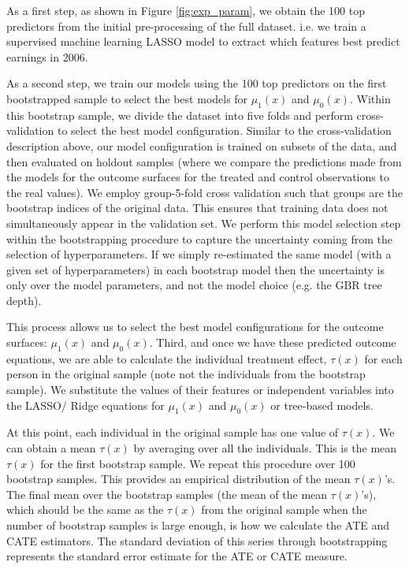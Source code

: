 \documentclass[12pt, a4paper]{article}
\begin{document}
As a first step, as shown in Figure \ref{fig:exp_param}, we obtain the 100 top predictors from the initial pre-processing of the full dataset. i.e. we train a supervised machine learning LASSO model to extract which features best predict earnings in 2006.

As a second step, we train our models using the 100 top predictors on the first bootstrapped sample to select the best models for $\mu _1(x)$ and $\mu _0(x)$. Within this bootstrap sample, we divide the dataset into five folds and perform cross-validation to select the best model configuration. Similar to the cross-validation description above, our model configuration is trained on subsets of the data, and then evaluated on holdout samples (where we compare the predictions made from the models for the outcome surfaces for the treated and control observations to the real values). We employ group-5-fold cross validation such that groups are the bootstrap indices of the original data. This ensures that training data does not simultaneously appear in the validation set. We perform this model selection step within the bootstrapping procedure to capture the uncertainty coming from the selection of hyperparameters. If we simply re-estimated the same model (with a given set of hyperparameters) in each bootstrap model then the uncertainty is only over the model parameters, and not the model choice (e.g. the GBR tree depth).

This process allows us to select the best model configurations for the outcome surfaces: $\mu _1(x)$ and $\mu _0(x)$. Third, and once we have these predicted outcome equations, we are able to calculate the individual treatment effect, $\tau(x)$ for each person in the original sample (note not the individuals from the bootstrap sample). We substitute the values of their features or independent variables into the LASSO/ Ridge equations for $\mu _1(x)$ and $\mu _0(x)$ or tree-based models.

At this point, each individual in the original sample has one value of $\tau(x)$. We can obtain a mean $\tau(x)$ by averaging over all the individuals. This is the mean $\tau(x)$ for the first bootstrap sample. We repeat this procedure over 100 bootstrap samples. This provides an empirical distribution of the mean $\tau(x)$'s. The final mean over the bootstrap samples (the mean of the mean $\tau(x)$'s), which should be the same as the $\tau(x)$ from the original sample when the number of bootstrap samples is large enough, is how we calculate the ATE and CATE estimators. The standard deviation of this series through bootstrapping represents the standard error estimate for the ATE or CATE measure. 
\end{document}
